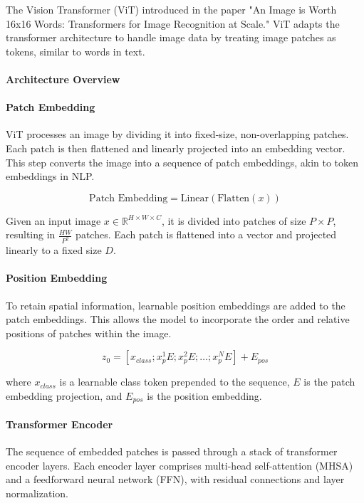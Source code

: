 \documentclass[12pt]{article}
\begin{document}
The Vision Transformer (ViT) introduced in the paper "An Image is Worth 16x16 Words: Transformers for Image Recognition at Scale." ViT adapts the transformer architecture to handle image data by treating image patches as tokens, similar to words in text.

\paragraph{Architecture Overview}

\paragraph{Patch Embedding}

ViT processes an image by dividing it into fixed-size, non-overlapping patches. Each patch is then flattened and linearly projected into an embedding vector. This step converts the image into a sequence of patch embeddings, akin to token embeddings in NLP.

\[
\text{Patch Embedding} = \text{Linear}(\text{Flatten}(x))
\]

Given an input image \(x \in \mathbb{R}^{H \times W \times C}\), it is divided into patches of size \(P \times P\), resulting in \(\frac{HW}{P^2}\) patches. Each patch is flattened into a vector and projected linearly to a fixed size \(D\).

\paragraph{Position Embedding}

To retain spatial information, learnable position embeddings are added to the patch embeddings. This allows the model to incorporate the order and relative positions of patches within the image.

\[
z_0 = [x_{class}; x_p^1 E; x_p^2 E; \dots; x_p^N E] + E_{pos}
\]

where \(x_{class}\) is a learnable class token prepended to the sequence, \(E\) is the patch embedding projection, and \(E_{pos}\) is the position embedding.

\paragraph{Transformer Encoder}

The sequence of embedded patches is passed through a stack of transformer encoder layers. Each encoder layer comprises multi-head self-attention (MHSA) and a feedforward neural network (FFN), with residual connections and layer normalization.
\end{document}

